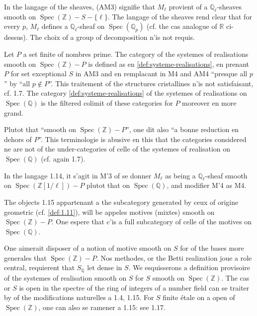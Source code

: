 \documentclass[12pt,a4paper]{article}
\theoremstyle{plain}
\theoremstyle{definition}
\theoremstyle{remark}
\DeclareMathOperator{\Spec}{Spec}
\providecommand{\Spec}{\operatorname{Spec}}
\begin{document}
In the langage of the sheaves, (AM3) signifie that $M_\ell$ provient of a
$\mathbb{Q}_\ell$-sheaves smooth on $\Spec(\mathbb{Z}) - S - \{\ell\}$. The langage of the
sheaves rend clear that for every $p$, $M_\ell$ defines a
$\mathbb{Q}_\ell$-sheaf on $\Spec(\mathbb{Q}_p)$ (cf. the cas analogue of
$\mathbb{R}$ ci-dessus). The choix of a group of decomposition n'is not requis.

\begin{variante}[1.15]
Let $P$ a set finite of nombres prime. The category of the systemes of
realisations smooth on $\Spec(\mathbb{Z}) - P$ is defined as en
\ref{def:systeme-realisations}, en prenant $P$ for set exceptional $S$ in AM3 and
en remplacant in M4 and AM4 ``presque all $p$'' by ``all $p \notin P$''. This
traitement of the structures cristallines n'is not satisfaisant, cf. 1.7. The category
\ref{def:systeme-realisations} of the systemes of realisations on $\Spec(\mathbb{Q})$
is the filtered colimit of these categories for $P$ moreover en more grand.

Plutot that ``smooth on $\Spec(\mathbb{Z}) - P$'', one dit also ``a bonne reduction
en dehors of $P$''. This terminologie is abusive en this that the categories considered
ne are not of the under-categories of celle of the systemes of realisation on
$\Spec(\mathbb{Q})$ (cf. again 1.7).
\end{variante}

In the langage 1.14, it s'agit in M'3 of se donner $M_\ell$ as being a
$\mathbb{Q}_\ell$-sheaf smooth on $\Spec(\mathbb{Z}[1/\ell]) - P$ plutot that on
$\Spec(\mathbb{Q})$, and modifier M'4 as M4.

The objects 1.15 appartenant a the subcategory generated by ceux of origine
geometric (cf. \ref{def:1.11}), will be appeles motives (mixtes) smooth on
$\Spec(\mathbb{Z}) - P$. One espere that c'is a full subcategory of celle of the
motives on $\Spec(\mathbb{Q})$.

One aimerait disposer of a notion of motive smooth on $S$ for of the bases more generales
that $\Spec(\mathbb{Z}) - P$. Nos methodes, or the Betti realization joue a role
central, requierent that $S_\mathbb{Q}$ let dense in $S$. We esquisserons a
definition provisoire of the systemes of realisation smooth on $S$ for $S$ smooth on
$\Spec(\mathbb{Z})$. The cas or $S$ is open in the spectre of the ring of integers
of a number field can se traiter by of the modifications naturelles a 1.4, 1.15. For
$S$ finite étale on a open of $\Spec(\mathbb{Z})$, one can also se ramener a 1.15:
see 1.17.
\end{document}
